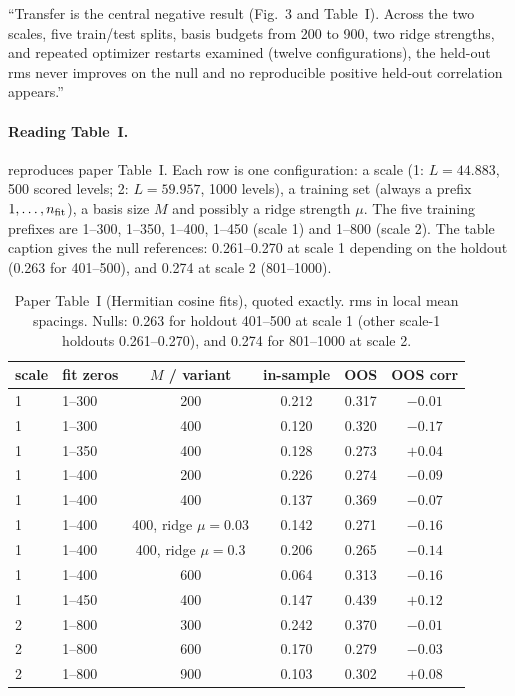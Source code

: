 ``Transfer is the central negative result (Fig.~3 and Table~I). Across the two scales, five train/test splits, basis budgets from 200 to 900, two ridge strengths, and repeated optimizer restarts examined (twelve configurations), the held-out rms never improves on the null and no reproducible positive held-out correlation appears.''

\paragraph{Reading Table~I.}  reproduces paper Table~I. Each row is one configuration: a scale (1: $L=44.883$, 500 scored levels; 2: $L=59.957$, 1000 levels), a training set (always a prefix $1,\dots,n_{\rm fit}$), a basis size $M$ and possibly a ridge strength $\mu$. The five training prefixes are 1--300, 1--350, 1--400, 1--450 (scale 1) and 1--800 (scale 2). The table caption gives the null references: 0.261--0.270 at scale 1 depending on the holdout (0.263 for 401--500), and 0.274 at scale 2 (801--1000).

\begin{table}[htbp]\centering
\caption{Paper Table~I (Hermitian cosine fits), quoted exactly. rms in local mean spacings. Nulls: 0.263 for holdout 401--500 at scale 1 (other scale-1 holdouts 0.261--0.270), and 0.274 for 801--1000 at scale 2.}
\label{tab:paper-memorization-tableI}
\begin{tabular}{llcccc}
\toprule
scale & fit zeros & $M$ / variant & in-sample & OOS & OOS corr \\
\midrule
1 & 1--300 & 200 & 0.212 & 0.317 & $-0.01$ \\
1 & 1--300 & 400 & 0.120 & 0.320 & $-0.17$ \\
1 & 1--350 & 400 & 0.128 & 0.273 & $+0.04$ \\
1 & 1--400 & 200 & 0.226 & 0.274 & $-0.09$ \\
1 & 1--400 & 400 & 0.137 & 0.369 & $-0.07$ \\
1 & 1--400 & 400, ridge $\mu=0.03$ & 0.142 & 0.271 & $-0.16$ \\
1 & 1--400 & 400, ridge $\mu=0.3$ & 0.206 & 0.265 & $-0.14$ \\
1 & 1--400 & 600 & 0.064 & 0.313 & $-0.16$ \\
1 & 1--450 & 400 & 0.147 & 0.439 & $+0.12$ \\
2 & 1--800 & 300 & 0.242 & 0.370 & $-0.01$ \\
2 & 1--800 & 600 & 0.170 & 0.279 & $-0.03$ \\
2 & 1--800 & 900 & 0.103 & 0.302 & $+0.08$ \\
\bottomrule
\end{tabular}
\end{table}

